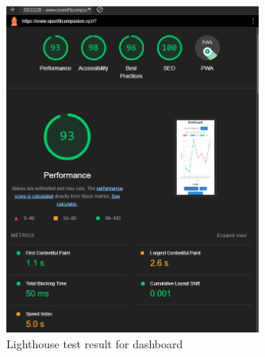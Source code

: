 \begin{figure}
    
    \centering
    \includegraphics[width=0.75\textwidth,keepaspectratio]{../images/lightHouseMainPage.png}
    \caption{Lighthouse test result for dashboard}
    \label{fig:lighthouse}
    
\end{figure}

